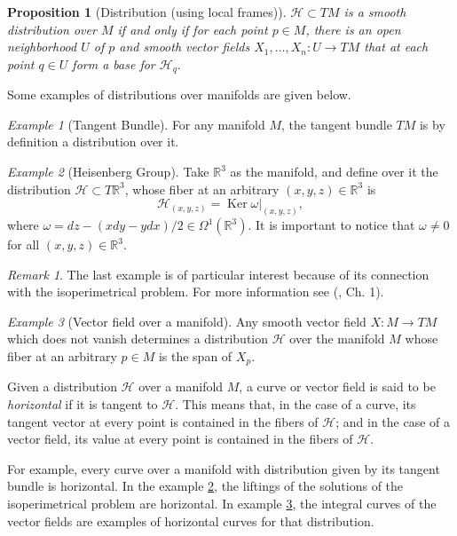 \documentclass[12pt, letterpaper, reqno]{amsart}
\theoremstyle{definition}
\theoremstyle{plain}
\newtheorem{prop}{Proposition}
\theoremstyle{remark}
\newtheorem{ex}{Example}
\newtheorem{rem}{Remark}
\begin{document}
\begin{prop} [Distribution (using local frames)]
	$ \mathcal{H}\subset TM $ is a smooth distribution over $M  $ if and only if  for each point $ p\in M $, there is an open neighborhood $ U $ of $ p $  and smooth vector fields $ X_1,\dots,X_n: U \rightarrow {TM} $ that at each point  $ q\in U $ form a base for $ \mathcal{H}_q. $ 
\end{prop}
Some examples of distributions over manifolds are given below.
\begin{ex}[Tangent Bundle]
	For any manifold $ M $, the tangent bundle $ TM $ is by definition a distribution over it. 
\end{ex}
\begin{ex}[Heisenberg Group]\label{ex:heis_group}
	Take $ \mathbb{R} ^3 $ as the manifold, and define over it the distribution $ \mathcal{H}\subset T \mathbb{R} ^3 $, whose fiber at an arbitrary $ (x,y,z)\in \mathbb{R}^3  $ is   
	$$ \mathcal{H}_{(x,y,z)} = \operatorname{Ker} \omega|_{(x,y,z)},$$
	where $ \omega = dz-(x dy-y dx)/2\in\Omega^1( \mathbb{R}^3).$ It is important to notice that $ \omega\neq 0 $ for all $ (x,y,z)\in \mathbb{R}^3. $ 
\end{ex}
\begin{rem}
	The last example is of particular interest because of its connection with the isoperimetrical problem. For more information see (\cite{montgomery2002tour}, Ch. 1).
\end{rem}
\begin{ex}[Vector field over a manifold]\label{ex:vect_field}
Any smooth vector field $ X: M \rightarrow {TM} $ which does not vanish  determines a distribution $ \mathcal{H}$ over the manifold $ M $ whose fiber at an arbitrary $ p\in M $ is the span of $ X_p. $
\end{ex}


Given a distribution $ \mathcal{H} $  over a manifold $M$,  a curve or vector field is said to be \textit{horizontal} if it is tangent to $ \mathcal{H} $. This means that, in the case of a curve, its tangent vector at every point is contained in the fibers of $ \mathcal{H} $; and in the case of a vector field, its value at every point is contained in the fibers of $ \mathcal{H} .$   

For example, every curve over a manifold with distribution given by its tangent bundle is horizontal. In the example \ref{ex:heis_group}, the liftings of the solutions of the isoperimetrical problem are horizontal. In example \ref{ex:vect_field}, the integral curves of the vector fields are examples of horizontal curves for that distribution.
\end{document}
